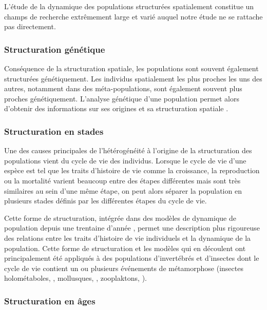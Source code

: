 L'étude de la dynamique des populations structurées spatialement constitue un
champs de recherche extrêmement large et varié auquel notre étude ne se rattache
pas directement. 

\subsubsection{Structuration génétique}

Conséquence de la structuration spatiale, les populations sont souvent également
structurées génétiquement. Les individus spatialement les plus proches les uns
des autres, notamment dans des méta-populations, sont également souvent plus
proches génétiquement. L'analyse génétique d'une population permet alors d'obtenir des
informations sur ses origines et sa structuration spatiale
\autocites{repaci2006a,booth2009a,jorde2007a}.

\subsubsection{Structuration en stades}

Une des causes principales de l'hétérogénéité à l'origine de la
structuration des populations vient du cycle de vie des individus. Lorsque le
cycle de vie d'une espèce est tel que les traits d'histoire de vie comme la
croissance, la reproduction ou la mortalité varient beaucoup entre des étapes
différentes mais sont très similaires au sein d'une même étape, on peut alors
séparer la population en plusieurs stades définis par les différentes étapes du
cycle de vie.

Cette forme de structuration, intégrée dans des modèles de dynamique de
population depuis une trentaine d'année \autocites{gurney1983a,nisbet1983a},
permet une description plus rigoureuse des relations entre les traits
d'histoire de vie individuels et la dynamique de la population. Cette forme de
structuration et les modèles qui en découlent \autocites{nisbet1989a} ont
principalement été appliqués à des populations d'invertébrés et d'insectes dont le cycle de vie contient un ou
plusieurs événements de métamorphose (insectes holométaboles,
\citealp{barclay1980model,gurney1980a,nisbet1983a}, mollusques,
\citealp{taris2006phenotypic}, zooplaktons, \citealp{mccauley1996a}).

\subsubsection{Structuration en âges}

